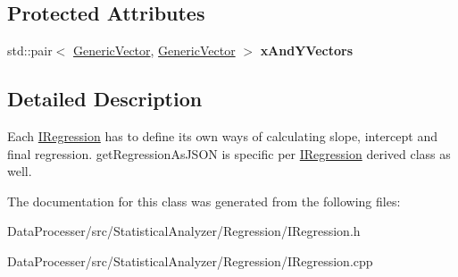 \subsection*{Protected Attributes}
\begin{DoxyCompactItemize}
\item 
\mbox{\label{classIRegression_abdce3eb0c896fe60b6c272060eab7860}} 
std\+::pair$<$ \hyperlink{classGenericVector}{Generic\+Vector}, \hyperlink{classGenericVector}{Generic\+Vector} $>$ {\bfseries x\+And\+Y\+Vectors}
\end{DoxyCompactItemize}


\subsection{Detailed Description}
Each \hyperlink{classIRegression}{I\+Regression} has to define its\textquotesingle{} own ways of calculating slope, intercept and final regression. \textquotesingle{}get\+Regression\+As\+J\+S\+ON\textquotesingle{} is specific per \hyperlink{classIRegression}{I\+Regression} derived class as well. 

The documentation for this class was generated from the following files\+:\begin{DoxyCompactItemize}
\item 
Data\+Processer/src/\+Statistical\+Analyzer/\+Regression/I\+Regression.\+h\item 
Data\+Processer/src/\+Statistical\+Analyzer/\+Regression/I\+Regression.\+cpp\end{DoxyCompactItemize}

